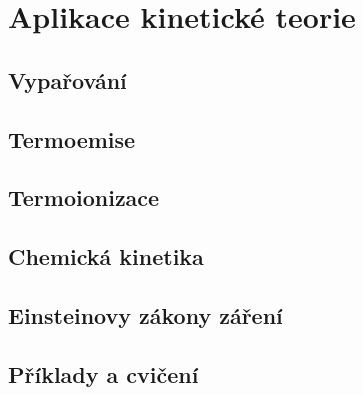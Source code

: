 \chapter{Aplikace kinetické teorie}\label{fyz:IchapXLII}
\minitoc
  \section{Vypařování}\label{fyz:IchapXLIIsecI}
  \section{Termoemise}\label{fyz:IchapXLIIsecII}
  \section{Termoionizace}\label{fyz:IchapXLIIsecIII}
  \section{Chemická kinetika}\label{fyz:IchapXLIIsecIV}
  \section{Einsteinovy zákony záření}\label{fyz:IchapXLIIsecV}
  \section{Příklady a cvičení}\label{fyz:IchapXVLIIsecVI}
